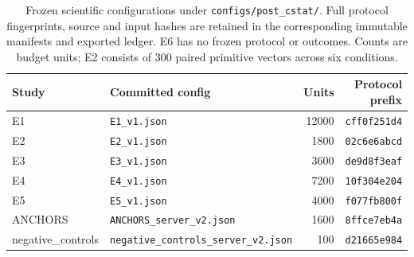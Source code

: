 \begin{table}[tbp]
\centering\small
\begin{tabular}{llrr}
\toprule
Study & Committed config & Units & Protocol prefix\\
\midrule
E1 & \texttt{E1\_v1.json} & 12000 & \texttt{cff0f251d4}\\
E2 & \texttt{E2\_v1.json} & 1800 & \texttt{02c6e6abcd}\\
E3 & \texttt{E3\_v1.json} & 3600 & \texttt{de9d8f3eaf}\\
E4 & \texttt{E4\_v1.json} & 7200 & \texttt{10f304e204}\\
E5 & \texttt{E5\_v1.json} & 4000 & \texttt{f077fb800f}\\
ANCHORS & \texttt{ANCHORS\_server\_v2.json} & 1600 & \texttt{8ffce7eb4a}\\
negative\_controls & \texttt{negative\_controls\_server\_v2.json} & 100 & \texttt{d21665e984}\\
\bottomrule
\end{tabular}
\caption{Frozen scientific configurations under \texttt{configs/post\_cstat/}. Full protocol fingerprints, source and input hashes are retained in the corresponding immutable manifests and exported ledger. E6 has no frozen protocol or outcomes. Counts are budget units; E2 consists of 300 paired primitive vectors across six conditions.}
\label{tab:post-configs}
\end{table}
